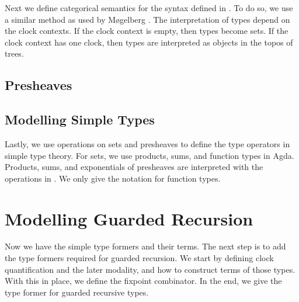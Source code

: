 \documentclass[a4paper,UKenglish,cleveref, autoref,numberwithinsect]{lipics-v2019}
\begin{document}
Next we define categorical semantics for the syntax defined in .
To do so, we use a similar method as used by M{\o}gelberg \cite{Mogelberg14}.
The interpretation of types depend on the clock contexts.
If the clock context is empty, then types become sets.
If the clock context has one clock, then types are interpreted as objects in the topos of trees.

\label{sec:presheaf_sem}
\subsection{Presheaves}
\label{sec:presheaves}







\subsection{Modelling Simple Types}












Lastly, we use operations on sets and presheaves to define the type operators in simple type theory.
For sets, we use products, sums, and function types in Agda.
Products, sums, and exponentials of presheaves are interpreted with the operations in .
We only give the notation for function types.



\section{Modelling Guarded Recursion}
\label{sec:guarded}
Now we have the simple type formers and their terms.
The next step is to add the type formers required for guarded recursion.
We start by defining clock quantification and the later modality, and how to construct terms of those types.
With this in place, we define the fixpoint combinator.
In the end, we give the type former for guarded recursive types.
\end{document}
